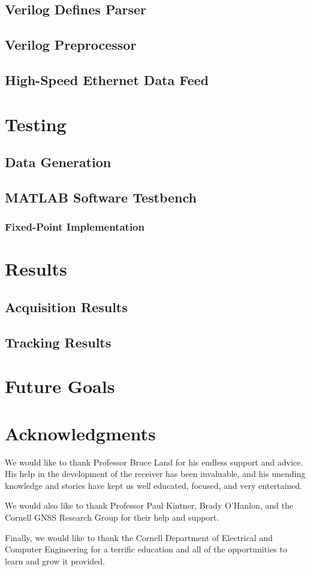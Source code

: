 \documentclass[12pt]{article}
\begin{document}
\subsection{Verilog Defines Parser}

\subsection{Verilog Preprocessor}

\subsection{High-Speed Ethernet Data Feed}

\section{Testing}

\subsection{Data Generation}

\subsection{MATLAB Software Testbench}

\subsubsection{Fixed-Point Implementation}

\section{Results}

\subsection{Acquisition Results}

\subsection{Tracking Results}

\section{Future Goals}

\section{Acknowledgments}
We would like to thank Professor Bruce Land for his endless support and advice. His help in the development of the receiver has been invaluable, and his unending knowledge and stories have kept us well educated, focused, and very entertained.

We would also like to thank Professor Paul Kintner, Brady O'Hanlon, and the Cornell GNSS Research Group for their help and support.

Finally, we would like to thank the Cornell Department of Electrical and Computer Engineering for a terrific education and all of the opportunities to learn and grow it provided.
\end{document}
